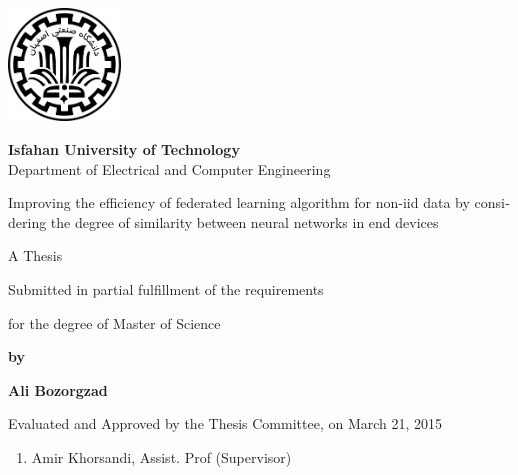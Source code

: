 \thispagestyle{empty}
\begin{latin}
\begin{center}
\includegraphics[height=3cm]{iut_logo.png}
\vspace{0.4cm}

{\large\textbf{Isfahan University of Technology}}\\

\vspace{0.4cm}
Department of Electrical and Computer Engineering

\vspace{2.5cm}

{\Huge
	Improving the efficiency of federated learning algorithm for non-iid data by considering the degree of similarity between neural networks in end devices
}

\vspace{1.5cm}

{\large
	A Thesis
	
	\vspace{.3cm}
	
	Submitted in partial fulfillment of the requirements
	
	\vspace{.3cm}
	
	for the degree of Master of Science
}

	\vspace{1.5cm}

{\Large
	\textbf{by}
	
	\vspace{.3cm}
	
	\textbf{Ali Bozorgzad}
}
\end{center}

\vfill

Evaluated and Approved by the Thesis Committee, on March 21, 2015
\vspace{0.5cm}

\begin{enumerate}
\item Amir Khorsandi, Assist. Prof (Supervisor)
\vspace{0.5cm}


\end{enumerate}
\end{latin}
